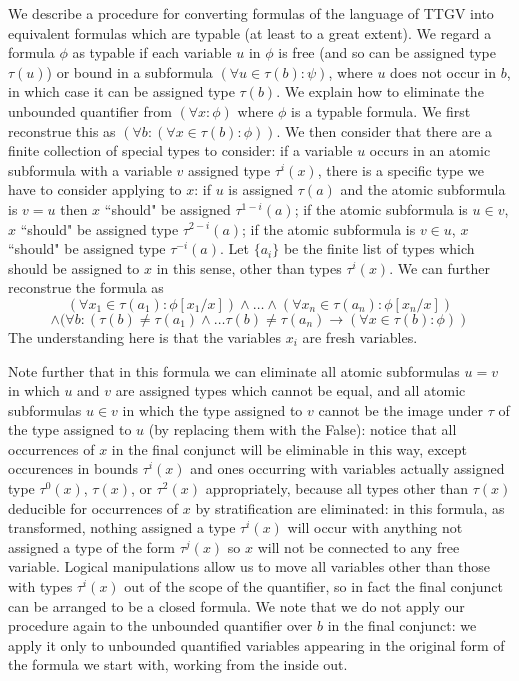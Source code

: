 \documentclass[12pt]{article}
\begin{document}
We describe a procedure for converting formulas of the language of TTGV into equivalent formulas which are typable (at least to a great extent).    We regard a formula $\phi$ as typable if each variable $u$ in $\phi$ is free (and so can be assigned type $\tau(u)$) or bound in a subformula $(\forall u \in \tau(b):\psi)$, where $u$ does not occur in $b$,
in which case it can be assigned type $\tau(b)$.  We explain how to eliminate the unbounded quantifier from $(\forall x:\phi)$ where $\phi$ is a typable formula.  We first reconstrue this as $(\forall b:(\forall x \in \tau(b):\phi))$.  We then consider that there are a finite collection of special types to consider:  if a variable $u$ occurs in an atomic subformula
with a variable $v$ assigned type $\tau^i(x)$, there is a specific type we have to consider applying to $x$:  if $u$ is assigned $\tau(a)$ and the atomic subformula is $v=u$ then $x$ ``should" be assigned $\tau^{1-i}(a)$;  if  the atomic subformula is $u \in v$, $x$ ``should" be assigned type $\tau^{2-i}(a)$;   if  the atomic subformula is $v \in u$, $x$ ``should" be assigned type $\tau^{-i}(a)$.  Let $\{a_i\}$
be the finite list of types which should be assigned to $x$ in this sense, other than types $\tau^i(x)$.  We can further reconstrue the formula as $$(\forall x_1 \in \tau(a_1):\phi[x_1/x]) \wedge \ldots \wedge (\forall x_n \in \tau(a_n):\phi[x_n/x]) $$ $$\wedge (\forall b:(\tau(b) \neq \tau(a_1) \wedge \ldots \tau(b) \neq \tau(a_n) \rightarrow (\forall x \in \tau(b):\phi))$$
The understanding here is that the variables $x_i$ are fresh variables.

Note further that in this formula we can eliminate all atomic subformulas $u=v$ in which $u$ and $v$ are assigned types which cannot be equal, and all atomic subformulas $u \in v$ in which the type assigned to $v$ cannot be the image under $\tau$ of the type assigned to $u$ (by replacing them with the False):  notice that all occurrences of $x$ in the final conjunct will be eliminable in this way, except occurences in bounds $\tau^i(x)$ and ones occurring with variables actually assigned type $\tau^0(x)$, $\tau(x)$, or $\tau^2(x)$ appropriately, because all types other than $\tau(x)$ deducible for occurrences of $x$ by stratification are eliminated:  in this formula, as transformed, nothing assigned a type $\tau^i(x)$ will occur with anything not assigned
a type of the form $\tau^j(x)$ so $x$ will not be connected to any free variable.  Logical manipulations allow us to move all variables other than those with types $\tau^i(x)$ out of the scope of the quantifier, so in fact the final conjunct can be arranged to be a closed formula.  We note that we do not apply our procedure again to the unbounded quantifier over $b$ in the final conjunct:  we apply it only to unbounded quantified variables appearing in the original form of the formula we start with, working from the inside out.
\end{document}
